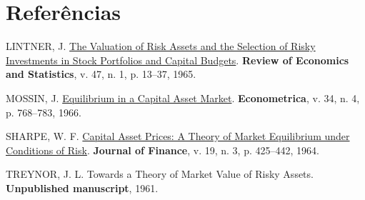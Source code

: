 \documentclass[
  12pt,
  a4paperpaper,
]{article}
\newlength{\cslhangindent}
\newenvironment{CSLReferences}[2] %
 {\begin{list}{}{%
  \setlength{\itemindent}{0pt}
  \setlength{\leftmargin}{0pt}
  \setlength{\parsep}{0pt}
  \ifodd #1
   \setlength{\leftmargin}{\cslhangindent}
   \setlength{\itemindent}{-1\cslhangindent}
  \fi
  \setlength{\itemsep}{#2\baselineskip}}}
 {\end{list}}
\begin{document}
\section*{Referências}\label{referuxeancias}

\label{refs}
\begin{CSLReferences}{0}{0}
LINTNER, J. \href{https://doi.org/10.2307/1924119}{The Valuation of Risk
Assets and the Selection of Risky Investments in Stock Portfolios and
Capital Budgets}. \textbf{Review of Economics and Statistics}, v. 47, n.
1, p. 13--37, 1965.

MOSSIN, J. \href{https://doi.org/10.2307/1910098}{Equilibrium in a
Capital Asset Market}. \textbf{Econometrica}, v. 34, n. 4, p. 768--783,
1966.

SHARPE, W. F. \href{https://doi.org/10.2307/2977928}{Capital Asset
Prices: A Theory of Market Equilibrium under Conditions of Risk}.
\textbf{Journal of Finance}, v. 19, n. 3, p. 425--442, 1964.

TREYNOR, J. L. Towards a Theory of Market Value of Risky Assets.
\textbf{Unpublished manuscript}, 1961.

\end{CSLReferences}
\end{document}
